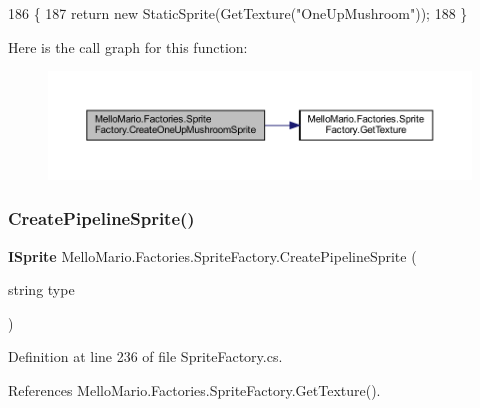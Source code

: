 \begin{DoxyCode}
186         \{
187             \textcolor{keywordflow}{return} \textcolor{keyword}{new} StaticSprite(GetTexture(\textcolor{stringliteral}{"OneUpMushroom"}));
188         \}
\end{DoxyCode}
Here is the call graph for this function\+:
\nopagebreak
\begin{figure}[H]
\begin{center}
\leavevmode
\includegraphics[width=350pt]{classMelloMario_1_1Factories_1_1SpriteFactory_a360acc8a347b0c7a3b18e7a52f4ec5de_cgraph}
\end{center}
\end{figure}
\mbox{\label{classMelloMario_1_1Factories_1_1SpriteFactory_a2ab8a84818855db99ff640d85c5c0388}} 
\subsubsection{Create\+Pipeline\+Sprite()}
{\footnotesize\ttfamily \textbf{ I\+Sprite} Mello\+Mario.\+Factories.\+Sprite\+Factory.\+Create\+Pipeline\+Sprite (\begin{DoxyParamCaption}\item[{string}]{type }\end{DoxyParamCaption})}



Definition at line 236 of file Sprite\+Factory.\+cs.



References Mello\+Mario.\+Factories.\+Sprite\+Factory.\+Get\+Texture().


